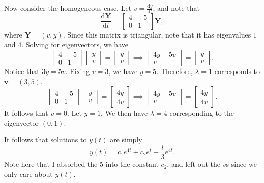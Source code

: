 \documentclass[11pt, letterpaper]{report}
\begin{document}
Now consider the homogeneous case. Let $v=\frac{\mathrm{d}y}{\mathrm{d}t} $, and note that
\[
	\frac{\mathrm{d}\mathbf{Y}}{\mathrm{d}t} =\begin{bmatrix} 4&-5 \\ 0&1 \end{bmatrix} \mathbf{Y}
,\]
where $\mathbf{Y}=(v,y)$. Since this matrix is triangular, note that it has eigenvalues $1$ and $4$. Solving for eigenvectors, we have
\[
	\begin{bmatrix} 4&-5 \\ 0&1 \end{bmatrix} \begin{bmatrix} y \\ v \end{bmatrix} =\begin{bmatrix} y \\ v \end{bmatrix} \implies \begin{bmatrix} 4y-5v \\ v \end{bmatrix} =\begin{bmatrix} y \\ v \end{bmatrix} 
.\]
Notice that $3y=5v$. Fixing $v=3$, we have $y=5$. Therefore, $\lambda =1$ corresponds to $\mathbf{v}=(3,5)$.
\[
	\begin{bmatrix} 4&-5 \\ 0&1 \end{bmatrix} \begin{bmatrix} y \\ v \end{bmatrix} =\begin{bmatrix} 4y \\ 4v \end{bmatrix} \implies \begin{bmatrix} 4y-5v \\ v \end{bmatrix} =\begin{bmatrix} 4y \\ 4v \end{bmatrix} 
.\]
It follows that $v=0$. Let $y=1$. We then have $\lambda =4$ corresponding to the eigenvector $(0,1)$.

It follows that solutions to $y(t)$ are simply
\[
	y(t)=c_1e^{4t}+c_2e^{t}+\frac{t}{3}e^{4t}
.\]
Note here that I absorbed the 5 into the constant $c_2$, and left out the $v$s since we only care about $y(t)$.
\end{document}
